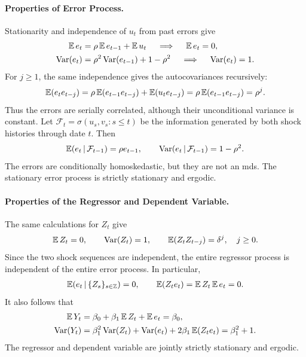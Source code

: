\documentclass[a4paper,12pt]{article}
\begin{document}
\paragraph{Properties of Error Process.}
Stationarity and independence of $u_t$ from past errors give
\begin{align}
	\operatorname{\mathbb{E}} e_t&=\rho\operatorname{\mathbb{E}} e_{t-1}+\operatorname{\mathbb{E}} u_t
	\quad\implies\quad \operatorname{\mathbb{E}} e_t=0,\\
	\operatorname{\text{\textrm{\upshape{Var}}}}(e_t)&=\rho^2\operatorname{\text{\textrm{\upshape{Var}}}}(e_{t-1})+1-\rho^2
	\quad\implies\quad \operatorname{\text{\textrm{\upshape{Var}}}}(e_t)=1.
\end{align}
For $j\ge1$, the same independence gives the autocovariances recursively:
\begin{align}
	\operatorname{\mathbb{E}}(e_te_{t-j})
	=\rho\operatorname{\mathbb{E}}(e_{t-1}e_{t-j})+\operatorname{\mathbb{E}}(u_te_{t-j})
	=\rho\operatorname{\mathbb{E}}(e_{t-1}e_{t-j})=\rho^j.
\end{align}
Thus the errors are serially correlated, although their unconditional variance is constant.
Let $\mathcal F_t=\sigma(u_s,v_s:s\le t)$ be the information generated by both shock histories through date $t$.
Then
\begin{align}
	\operatorname{\mathbb{E}}(e_t\mathpunct{}|\mathpunct{}\mathcal F_{t-1})=\rho e_{t-1},
	\qquad \operatorname{\text{\textrm{\upshape{Var}}}}(e_t\mathpunct{}|\mathpunct{}\mathcal F_{t-1})=1-\rho^2.
\end{align}
The errors are conditionally homoskedastic, but they are not an \gls{mds}.
The stationary error process is strictly stationary and ergodic.

\paragraph{Properties of the Regressor and Dependent Variable.}
The same calculations for $Z_t$ give
\begin{align}
	\operatorname{\mathbb{E}} Z_t=0,\qquad \operatorname{\text{\textrm{\upshape{Var}}}}(Z_t)=1,\qquad \operatorname{\mathbb{E}}(Z_tZ_{t-j})=\delta^j,\quad j\ge0.
\end{align}
Since the two shock sequences are independent, the entire regressor process is independent of the entire error process.
In particular,
\begin{align}
	\operatorname{\mathbb{E}}(e_t\mathpunct{}|\mathpunct{}\{Z_s\}_{s\in\mathbb Z})=0,
	\qquad \operatorname{\mathbb{E}}(Z_te_t)=\operatorname{\mathbb{E}} Z_t\operatorname{\mathbb{E}} e_t=0.
\end{align}
It also follows that
\begin{align}
	\operatorname{\mathbb{E}} Y_t&=\beta_0+\beta_1\operatorname{\mathbb{E}} Z_t+\operatorname{\mathbb{E}} e_t=\beta_0,\\
	\operatorname{\text{\textrm{\upshape{Var}}}}(Y_t)&=\beta_1^2\operatorname{\text{\textrm{\upshape{Var}}}}(Z_t)+\operatorname{\text{\textrm{\upshape{Var}}}}(e_t)+2\beta_1\operatorname{\mathbb{E}}(Z_te_t)=\beta_1^2+1.
\end{align}
The regressor and dependent variable are jointly strictly stationary and ergodic.
\end{document}
